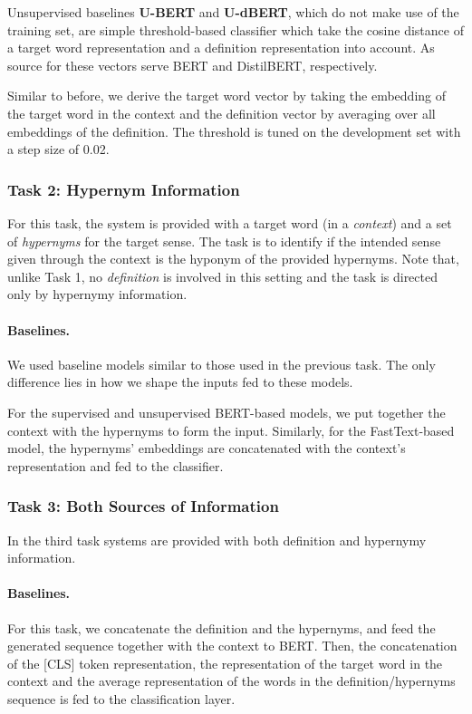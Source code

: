\documentclass[11pt,a4paper]{article}
\begin{document}
Unsupervised baselines \textbf{U-BERT} and \textbf{U-dBERT}, which do not make use of the training set, are simple threshold-based classifier which take the cosine distance of a target word representation and a definition representation into account. As source for these vectors serve BERT and DistilBERT, respectively. 

Similar to before, we derive the target word vector by taking the embedding of the target word in the context and the definition vector by averaging over all embeddings of the definition. The threshold is tuned on the development set with a step size of 0.02.

\subsubsection{Task 2: Hypernym Information}
\label{hypernym}

For this task, the system is provided with a target word (in a {\it context}) and a set of {\it hypernyms} for the target sense.
The task is to identify if the intended sense given through the context is the hyponym of the provided hypernyms. 
Note that, unlike Task 1, no {\it definition} is involved in this setting and the task is directed only by hypernymy information.

\paragraph{Baselines.}
We used baseline models similar to those used in the previous task. The only difference lies in how we shape the inputs fed to these models.

For the supervised and unsupervised BERT-based models, we put together the context with the hypernyms to form the input.
Similarly, for the FastText-based model, the hypernyms' embeddings are concatenated with the context's representation and fed to the classifier.

\subsubsection{Task 3: Both Sources of Information}
\label{task3}

In the third task systems are provided with both definition and hypernymy information. 


\paragraph{Baselines.}
For this task, we concatenate the definition and the hypernyms, and feed the generated sequence together with the context to BERT. Then, the concatenation of the [CLS] token representation, the representation of the target word in the context and the average representation of the words in the definition/hypernyms sequence is fed to the classification layer.
\end{document}
